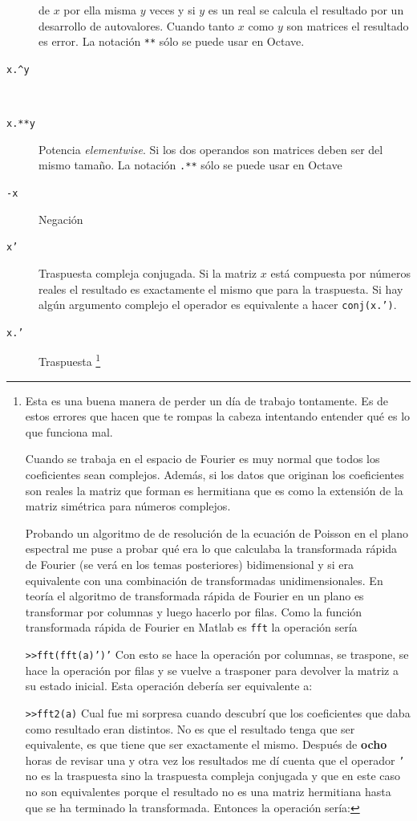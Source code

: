 \begin{description}
  de $x$ por ella misma $y$ veces y si $y$ es un real se calcula el
  resultado por un desarrollo de autovalores. Cuando tanto $x$ como
  $y$ son matrices el resultado es error. La notación \texttt{{*}{*}}
  sólo se puede usar en Octave.
\item [\texttt{x.\textasciicircum{}y}]~
\item [\texttt{x.{*}{*}y}]Potencia \emph{elementwise}. Si los dos
  operandos son matrices deben ser del mismo tamaño. La notación
  \texttt{.{*}{*}} sólo se puede usar en Octave
\item [\texttt{-x}]Negación
\item [\texttt{x'}]Traspuesta compleja conjugada. Si
  la matriz $x$ está compuesta por números reales el resultado es
  exactamente el mismo que para la traspuesta. Si hay algún argumento
  complejo el operador es equivalente a hacer \texttt{conj(x.')}.
\item [\texttt{x.'}]Traspuesta \footnote{Esta es una buena manera de
    perder un día de trabajo tontamente. Es de estos errores que hacen
    que te rompas la cabeza intentando entender qué es lo que funciona
    mal.

    Cuando se trabaja en el espacio de Fourier es muy normal que todos
    los coeficientes sean complejos. Además, si los datos que originan
    los coeficientes son reales la matriz que forman es hermitiana que
    es como la extensión de la matriz simétrica para números
    complejos.

    Probando un algoritmo de de resolución de la ecuación de Poisson
    en el plano espectral me puse a probar qué era lo que calculaba la
    transformada rápida de Fourier (se verá en los temas posteriores)
    bidimensional y si era equivalente con una combinación de
    transformadas unidimensionales.  En teoría el algoritmo de
    transformada rápida de Fourier en un plano es transformar por
    columnas y luego hacerlo por filas. Como la función transformada
    rápida de Fourier en Matlab es \texttt{fft} la operación sería


    \texttt{>{}>fft(fft(a)')'} Con esto se hace la operación por
    columnas, se traspone, se hace la operación por filas y se vuelve
    a trasponer para devolver la matriz a su estado inicial. Esta
    operación debería ser equivalente a:

    \texttt{>{}>fft2(a)} Cual fue mi sorpresa cuando descubrí que los
    coeficientes que daba como resultado eran distintos. No es que el
    resultado tenga que ser equivalente, es que tiene que ser
    exactamente el mismo.  Después de \textbf{ocho} horas de revisar
    una y otra vez los resultados me dí cuenta que el operador
    \texttt{'} no es la traspuesta sino la traspuesta compleja
    conjugada y que en este caso no son equivalentes porque el
    resultado no es una matriz hermitiana hasta que se ha terminado la
    transformada. Entonces la operación sería:

}
\end{description}
